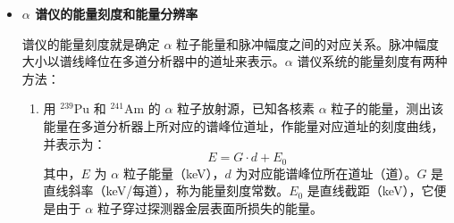 \documentclass[dvipsnames, svgnames,a4paper,11pt]{article}
\begin{document}
\begin{itemize}
				
			
			

				

			
		



		\item \textbf{$\alpha$ 谱仪的能量刻度和能量分辨率}

			谱仪的能量刻度就是确定 $\alpha$ 粒子能量和脉冲幅度之间的对应关系。脉冲幅度大小以谱线峰位在多道分析器中的道址来表示。$\alpha$ 谱仪系统的能量刻度有两种方法：

			\begin{enumerate}
				\item 用 $^{239} \mathrm{Pu}$ 和 $^{241} \mathrm{Am}$ 的 $\alpha$ 粒子放射源，已知各核素 $\alpha$ 粒子的能量，测出该能量在多道分析器上所对应的谱峰位道址，作能量对应道址的刻度曲线，并表示为：
				\[
					E = G \cdot d + E_0
				\]
				其中，$E$ 为 $\alpha$ 粒子能量（keV），$d$ 为对应能谱峰位所在道址（道）。$G$ 是直线斜率（keV/每道），称为能量刻度常数。$E_0$ 是直线截距（keV），它便是由于 $\alpha$ 粒子穿过探测器金层表面所损失的能量。



\end{enumerate}
\end{itemize}
\end{document}
